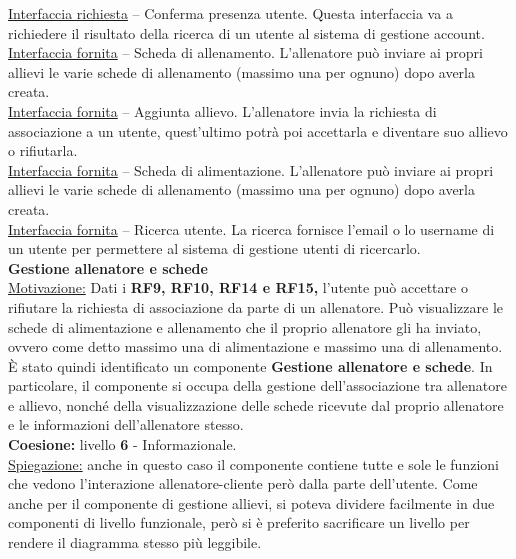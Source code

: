 \documentclass{article}
\begin{document}
      \underline{Interfaccia richiesta} – Conferma presenza utente. Questa interfaccia va a richiedere il risultato della ricerca di un utente al sistema di gestione account.\\

      \underline{Interfaccia fornita} – Scheda di allenamento. L’allenatore può inviare ai propri allievi le varie schede di allenamento (massimo una per ognuno) dopo averla creata.\\

      \underline{Interfaccia fornita} – Aggiunta allievo. L’allenatore invia la richiesta di associazione a un utente, quest’ultimo potrà poi accettarla e diventare suo allievo o
      rifiutarla.\\

      \underline{Interfaccia fornita} – Scheda di alimentazione. L’allenatore può inviare ai propri allievi le varie schede di allenamento (massimo una per ognuno) dopo averla creata.\\

      \underline{Interfaccia fornita} – Ricerca utente. La ricerca fornisce l’email o lo username di un utente per permettere al sistema di gestione utenti di ricercarlo.\\


      {\Large\textbf{Gestione allenatore e schede}}\\

      \underline{Motivazione:} Dati i \textbf{RF9, RF10, RF14 e RF15,} l’utente può accettare o rifiutare la richiesta di associazione da parte di un allenatore. Può visualizzare le
      schede di alimentazione e allenamento che il proprio allenatore gli ha inviato, ovvero come detto massimo una di alimentazione e massimo una di allenamento. È stato quindi
      identificato un componente \textbf{Gestione allenatore e schede}. In particolare, il componente si occupa della gestione dell’associazione tra allenatore e allievo, nonché della
      visualizzazione delle schede ricevute dal proprio allenatore e le informazioni dell’allenatore stesso.\\

      \textbf{Coesione:} livello \textbf{6} - Informazionale.\\

      \underline{Spiegazione:} anche in questo caso il componente contiene tutte e sole le funzioni che vedono l’interazione allenatore-cliente però dalla parte dell’utente. Come
      anche per il componente di gestione allievi, si poteva dividere facilmente in due componenti di livello funzionale, però si è preferito sacrificare un livello per rendere il
      diagramma stesso più leggibile.\\
\end{document}
